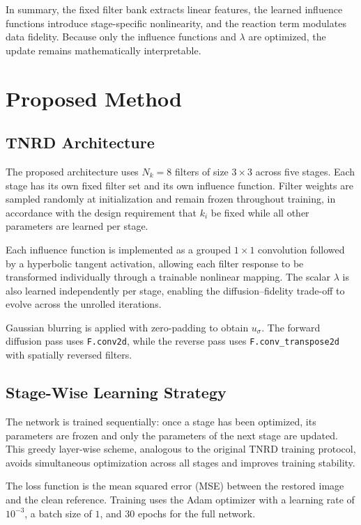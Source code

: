\documentclass[conference]{IEEEtran}
\begin{document}
In summary, the fixed filter bank extracts linear features, the learned influence
functions introduce stage-specific nonlinearity, and the reaction term modulates
data fidelity. Because only the influence functions and $\lambda$ are optimized,
the update remains mathematically interpretable.

\section{Proposed Method}

\subsection{TNRD Architecture}
The proposed architecture uses $N_k = 8$ filters of size $3\times3$ across five
stages. Each stage has its own fixed filter set and its own influence function.
Filter weights are sampled randomly at initialization and remain frozen throughout
training, in accordance with the design requirement that $k_i$ be fixed while all
other parameters are learned per stage.

Each influence function is implemented as a grouped $1\times1$ convolution followed
by a hyperbolic tangent activation, allowing each filter response to be transformed
individually through a trainable nonlinear mapping. The scalar $\lambda$ is also
learned independently per stage, enabling the diffusion--fidelity trade-off to
evolve across the unrolled iterations.

Gaussian blurring is applied with zero-padding to obtain $u_\sigma$. The forward
diffusion pass uses \texttt{F.conv2d}, while the reverse pass uses
\texttt{F.conv\_transpose2d} with spatially reversed filters.

\subsection{Stage-Wise Learning Strategy}
The network is trained sequentially: once a stage has been optimized, its parameters
are frozen and only the parameters of the next stage are updated. This greedy
layer-wise scheme, analogous to the original TNRD training protocol, avoids
simultaneous optimization across all stages and improves training stability.

The loss function is the mean squared error (MSE) between the restored image and
the clean reference. Training uses the Adam optimizer with a learning rate of
$10^{-3}$, a batch size of $1$, and $30$ epochs for the full network.
\end{document}
